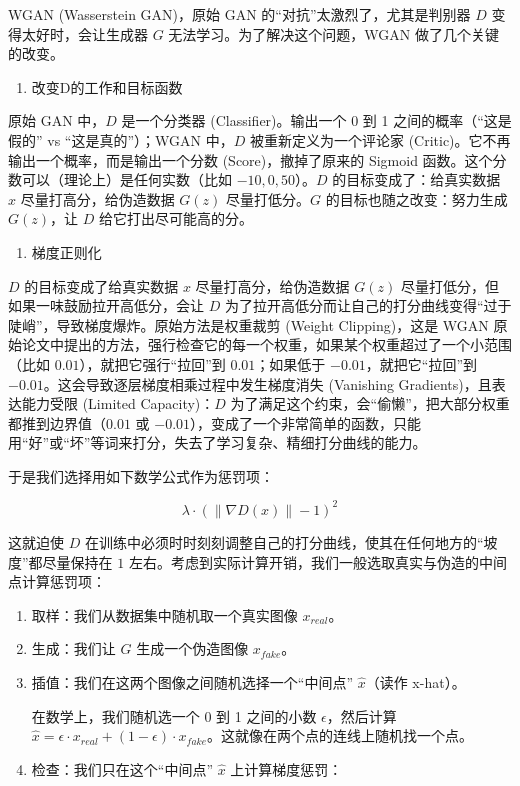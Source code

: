 WGAN (Wasserstein GAN)，原始 GAN 的``对抗''太激烈了，尤其是判别器 \(D\) 变得太好时，会让生成器 \(G\) 无法学习。为了解决这个问题，WGAN 做了几个关键的改变。

\begin{enumerate}
\def\labelenumi{\arabic{enumi}.}
\tightlist
\item
  改变D的工作和目标函数
\end{enumerate}

原始 GAN 中，\(D\) 是一个分类器 (Classifier)。输出一个 0 到 1 之间的概率（``这是假的'' vs ``这是真的''）；WGAN 中，\(D\) 被重新定义为一个评论家 (Critic)。它不再输出一个概率，而是输出一个分数 (Score)，撤掉了原来的 Sigmoid 函数。这个分数可以（理论上）是任何实数（比如 \(-10, 0, 50\)）。\(D\) 的目标变成了：给真实数据 \(x\) 尽量打高分，给伪造数据 \(G(z)\) 尽量打低分。\(G\) 的目标也随之改变：努力生成 \(G(z)\)，让 \(D\) 给它打出尽可能高的分。

\begin{enumerate}
\def\labelenumi{\arabic{enumi}.}
\setcounter{enumi}{1}
\tightlist
\item
  梯度正则化
\end{enumerate}

\(D\) 的目标变成了给真实数据 \(x\) 尽量打高分，给伪造数据 \(G(z)\) 尽量打低分，但如果一味鼓励拉开高低分，会让 \(D\) 为了拉开高低分而让自己的打分曲线变得``过于陡峭''，导致梯度爆炸。原始方法是权重裁剪 (Weight Clipping)，这是 WGAN 原始论文中提出的方法，强行检查它的每一个权重，如果某个权重超过了一个小范围（比如 \(0.01\)），就把它强行``拉回''到 \(0.01\)；如果低于 \(-0.01\)，就把它``拉回''到 \(-0.01\)。这会导致逐层梯度相乘过程中发生梯度消失 (Vanishing Gradients)，且表达能力受限 (Limited Capacity)：\(D\) 为了满足这个约束，会``偷懒''，把大部分权重都推到边界值（\(0.01\) 或 \(-0.01\)），变成了一个非常简单的函数，只能用``好''或``坏''等词来打分，失去了学习复杂、精细打分曲线的能力。

于是我们选择用如下数学公式作为惩罚项：

\[
\lambda \cdot (\lVert \nabla D(x) \rVert - 1)^2
\]

这就迫使 \(D\) 在训练中必须时时刻刻调整自己的打分曲线，使其在任何地方的``坡度''都尽量保持在 \(1\) 左右。考虑到实际计算开销，我们一般选取真实与伪造的中间点计算惩罚项：

\begin{enumerate}
\def\labelenumi{\arabic{enumi}.}
\item
  取样：我们从数据集中随机取一个真实图像 \(x_{real}\)。
\item
  生成：我们让 \(G\) 生成一个伪造图像 \(x_{fake}\)。
\item
  插值：我们在这两个图像之间随机选择一个``中间点'' \(\hat{x}\)（读作 x-hat）。

  在数学上，我们随机选一个 0 到 1 之间的小数 \(\epsilon\)，然后计算 \(\hat{x}=\epsilon\cdot x_{real}+(1-\epsilon)\cdot x_{fake}\)。这就像在两个点的连线上随机找一个点。
\item
{}
  检查：我们只在这个``中间点'' \(\hat{x}\) 上计算梯度惩罚：
\end{enumerate}

